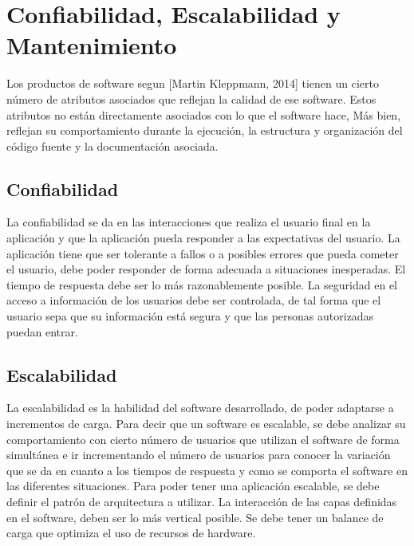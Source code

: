 \section{Confiabilidad, Escalabilidad y Mantenimiento}
\noindent Los productos de software segun [Martin Kleppmann, 2014] tienen un cierto número de atributos asociados que reflejan la calidad de ese software. Estos atributos no están directamente asociados con lo que el software hace, Más bien, reflejan su comportamiento durante la ejecución, la estructura y organización del código fuente y la documentación asociada.

\subsection{Confiabilidad}
\noindent La confiabilidad se da en las interacciones que realiza el usuario final en la aplicación y que la aplicación pueda responder a las expectativas del usuario. La aplicación tiene que ser tolerante a fallos o a posibles errores que pueda cometer el usuario, debe poder responder de forma adecuada a situaciones inesperadas. El tiempo de respuesta debe ser lo más razonablemente posible. La seguridad en el acceso a información de los usuarios debe ser controlada, de tal forma que el usuario sepa que su información está segura y que las personas autorizadas puedan entrar.


\subsection{Escalabilidad}
\noindent La escalabilidad es la habilidad del software desarrollado, de poder adaptarse a incrementos de carga. Para decir que un software es escalable, se debe analizar su comportamiento con cierto número de usuarios que utilizan el software de forma simultánea e ir incrementando el número de usuarios para conocer la variación que se da en cuanto a los tiempos de respuesta y como se comporta el software en las diferentes situaciones.
\noindent Para poder tener una aplicación escalable, se debe definir el patrón de arquitectura a utilizar. La interacción de las capas definidas en el software, deben ser lo más vertical posible. Se debe tener un balance de carga que optimiza el uso de recursos de hardware. 

